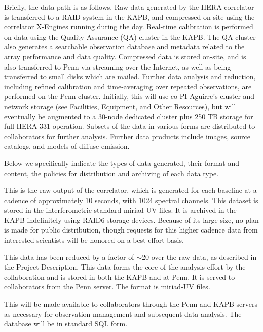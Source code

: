 \documentclass[preprint]{aastex}
\begin{document}
Briefly, the data path is as follows. Raw data generated by the HERA correlator is transferred to a RAID system in the KAPB, and compressed on-site using the correlator X-Engines running during the day.  Real-time calibration is performed on data using the Quality Assurance (QA) cluster in the KAPB.  The QA cluster also generates a searchable observation database and metadata related to the array performance and data quality.
Compressed data is stored on-site, and is also transferred to Penn via streaming over the Internet, as well as being transferred to small disks which are mailed.  Further data analysis and reduction, including refined calibration and time-averaging over repeated observations, are performed on the Penn cluster.  Initially, this will use co-PI Aguirre's cluster and network storage (see Facilities, Equipment, and Other Resources), but will eventually be augmented to a 30-node dedicated cluster plus 250 TB storage for full HERA-331 operation. Subsets of the data in various forms are distributed to collaborators for further analysis.  Further data products include images, source catalogs, and models of diffuse emission.  

Below we specifically indicate the types of data generated, their format and content, the policies for distribution and archiving of each data type.

  This is the raw output of the correlator, which is generated for each baseline at a cadence of approximately 10 seconds, with 1024 spectral channels.  This dataset is stored in the interferometric standard {\sc miriad}-UV files.  It is archived in the KAPB indefinitely using RAID6 storage devices.  Because of its large size, no plan is made for public distribution, though requests for this higher cadence data from interested scientists will be honored on a best-effort basis.
 
  This data has been reduced by a factor of $\sim$20 over the raw data, as described in the Project Description.  This data forms the core of the analysis effort by the collaboration and is stored in both the KAPB and at Penn.  It is served to collaborators from the Penn server.  The format is {\sc miriad}-UV files.
 
  This will be made available to collaborators through the Penn and KAPB servers as necessary for observation management and subsequent data analysis.  The database will be in standard SQL form.
 
\end{document}
